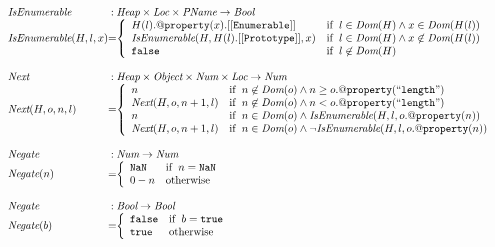 \[\begin{array}{l@{}c@{}l}
\hf{IsEnumerable} & :& \Heap \times \Loc \times \pname \rightarrow \Bool \\
\hf{IsEnumerable}(H, l, x) &=&
\left\{ \begin{array}{ll}
H(l).{\tt @property}(x).{\tt[[Enumerable]]}
&\ifc{l \in\hf{Dom}(H) \wedge x\in\hf{Dom}(H(l))}\\
\hf{IsEnumerable}(H, H(l).{\tt [[Prototype]]}, x)
&\ifc{l \in\hf{Dom}(H) \wedge x\not\in\hf{Dom}(H(l))}\\
\false &\ifc{l \not\in\hf{Dom}(H)}\\
\end{array}
\right.
\\\\

\hf{Next} & :& \Heap \times \Obj \times \Num \times \Loc \rightarrow \Num \\
\hf{Next}(H, o, n, l) &=&
\left\{ \begin{array}{ll}
n &\ifc{n \not\in\hf{Dom}(o) \wedge n \ge o.{\tt@property}(``{\tt length}")}\\
\hf{Next}(H, o, n+1, l) &\ifc{n \not\in\hf{Dom}(o) \wedge n < o.{\tt@property}(``{\tt length}")}\\
n &\ifc{n \in\hf{Dom}(o) \wedge \hf{IsEnumerable}(H, l, o.{\tt@property}(n))}\\
\hf{Next}(H, o, n+1, l)
 &\ifc{n \in\hf{Dom}(o) \wedge \neg\hf{IsEnumerable}(H, l, o.{\tt@property}(n))}\\
\end{array}
\right.
\\\\

\hf{Negate} & :& \Num \rightarrow \Num \\
\hf{Negate}(n) &=&
\left\{ \begin{array}{ll}
{\tt NaN} &\ifc{n = {\tt NaN}}\\
0-n &\mbox{otherwise}\\
\end{array}
\right.
\\\\

\hf{Negate} & :& \Bool \rightarrow \Bool \\
\hf{Negate}(b) &=&
\left\{ \begin{array}{ll}
\false &\ifc{b = \true}\\
\true &\mbox{otherwise}\\
\end{array}
\right.
\\\\



\end{array}\]
